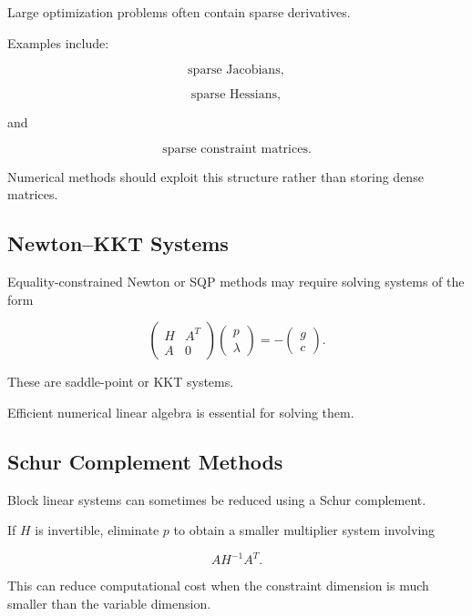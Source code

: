 Large optimization problems often contain sparse derivatives.

Examples include:

\[
\boxed{
\text{sparse Jacobians},
}
\]

\[
\boxed{
\text{sparse Hessians},
}
\]

and

\[
\boxed{
\text{sparse constraint matrices}.
}
\]

Numerical methods should exploit this structure rather than storing dense
matrices.

\subsection{Newton--KKT Systems}
\label{subsec:newton-kkt-systems}

Equality-constrained Newton or SQP methods may require solving systems of
the form

\[
\boxed{
\begin{pmatrix}
H & A^T\\
A & 0
\end{pmatrix}
\begin{pmatrix}
p\\
\lambda
\end{pmatrix}
=
-
\begin{pmatrix}
g\\
c
\end{pmatrix}.
}
\]

These are saddle-point or KKT systems.

Efficient numerical linear algebra is essential for solving them.

\subsection{Schur Complement Methods}
\label{subsec:optimization-schur-complement}

Block linear systems can sometimes be reduced using a Schur complement.

If \(H\) is invertible, eliminate \(p\) to obtain a smaller multiplier
system involving

\[
\boxed{
AH^{-1}A^T.
}
\]

This can reduce computational cost when the constraint dimension is much
smaller than the variable dimension.

